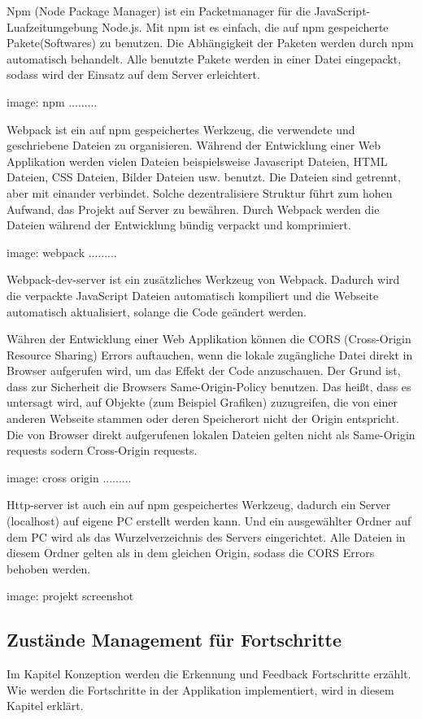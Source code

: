  Npm (Node Package Manager) ist ein Packetmanager für die JavaScript-Luafzeitumgebung Node.js. Mit npm ist es einfach, die auf npm gespeicherte Pakete(Softwares) zu benutzen. Die Abhängigkeit der Paketen werden durch npm automatisch behandelt. Alle benutzte Pakete werden in einer Datei eingepackt, sodass wird der Einsatz auf dem Server erleichtert.
 
 image: npm .........
 
 Webpack ist ein auf npm gespeichertes Werkzeug, die verwendete und geschriebene Dateien zu organisieren. Während der Entwicklung einer Web Applikation werden vielen Dateien beispielsweise Javascript Dateien, HTML Dateien, CSS Dateien, Bilder Dateien usw. benutzt. Die Dateien sind getrennt, aber mit einander verbindet. Solche dezentralisiere Struktur führt zum hohen Aufwand, das Projekt auf Server zu bewähren. Durch Webpack werden die Dateien während der Entwicklung bündig verpackt und komprimiert.
 
 image: webpack .........
 
 Webpack-dev-server ist ein zusätzliches Werkzeug von Webpack. Dadurch wird die verpackte JavaScript Dateien automatisch kompiliert und die Webseite automatisch aktualisiert, solange die Code geändert werden.
 
 Währen der Entwicklung einer Web Applikation können die CORS (Cross-Origin Resource Sharing) Errors auftauchen, wenn die lokale zugängliche Datei direkt in Browser aufgerufen wird, um das Effekt der Code anzuschauen. Der Grund ist, dass zur Sicherheit die Browsers Same-Origin-Policy benutzen. Das heißt, dass es untersagt wird, auf Objekte (zum Beispiel Grafiken) zuzugreifen, die von einer anderen Webseite stammen oder deren Speicherort nicht der Origin entspricht. Die von Browser direkt aufgerufenen lokalen Dateien gelten nicht als Same-Origin requests sodern Cross-Origin requests.
 
 image: cross origin .........
 
 Http-server ist auch ein auf npm gespeichertes Werkzeug, dadurch ein Server (localhost) auf eigene PC erstellt werden kann. Und ein ausgewählter Ordner auf dem PC wird als das Wurzelverzeichnis des Servers eingerichtet. Alle Dateien in diesem Ordner gelten als in dem gleichen Origin, sodass die CORS Errors behoben werden.
 
 image: projekt screenshot 
 
 \subsection{Zustände Management für Fortschritte}
 Im Kapitel Konzeption werden die Erkennung und Feedback Fortschritte erzählt. Wie werden die Fortschritte in der Applikation implementiert, wird in diesem Kapitel erklärt.
 

